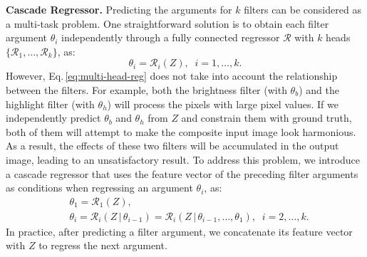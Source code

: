 \documentclass[runningheads]{llncs}
\newcommand{\ke}[1]{{\color{black}#1}}
\begin{document}
\textbf{Cascade Regressor.} 
Predicting the arguments for $k$ filters can be considered as a multi-task problem. One straightforward solution is to obtain each filter argument $\theta_i$ independently through a fully connected regressor $\mathcal{R}$ with $k$ heads $\{\mathcal{R}_{1}, \dots, \mathcal{R}_{k}\}$, as:
\begin{equation}\label{eq:multi-head-reg}
    \theta_{i} = \mathcal{R}_{i} (Z),\;\; i=1, \dots, k.
\end{equation}
\ke{However, Eq.\,\ref{eq:multi-head-reg} does not take into account the relationship between the filters.}
For example, both the brightness filter (with $\theta_{b}$) and the highlight filter (with $\theta_{h}$) will process the pixels with large pixel values. If we independently predict $\theta_{b}$ and $\theta_{h}$ from $Z$ \ke{and constrain them with ground truth, both of them will attempt to make the composite input image look harmonious}. As a result, the effects of these two filters will be accumulated in the output image, leading to an unsatisfactory result.  
To address this problem, we introduce a cascade regressor that uses the feature vector of the preceding filter arguments as conditions when regressing an argument $\theta_i$, as: 
\begin{equation}
\begin{split}
    &\theta_1 = \mathcal{R}_{1} (Z), \\
    &\theta_{i} = \mathcal{R}_{i} (Z \,|\, \theta_{i-1}) = \mathcal{R}_{i} (Z \,|\, \theta_{i-1}, \dots, \theta_{1}),\;\; i=2, \dots, k.
\end{split}
\end{equation}
In practice, after predicting a filter argument, we concatenate its feature vector with $Z$ to regress the next argument.
\end{document}
